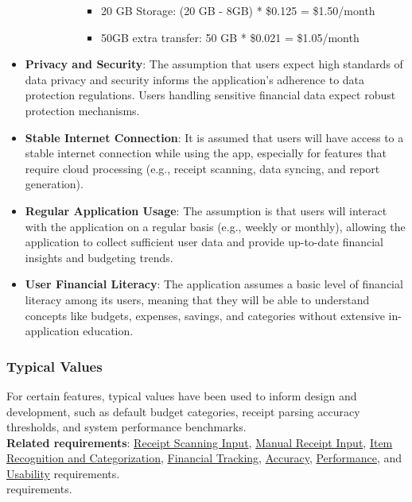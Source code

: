\documentclass[12pt]{article}
\begin{document}
\begin{itemize}
\begin{itemize}
\begin{enumerate}
\begin{itemize}
\begin{itemize}
						\item 20 GB Storage: (20 GB - 8GB) * \$0.125 = \$1.50/month
						\item 50GB extra transfer: 50 GB * \$0.021 = \$1.05/month
					\end{itemize}
				\end{itemize}
			\end{enumerate}
		\end{itemize}
    \item \textbf{Privacy and Security}: The assumption that users expect high
    standards of data privacy and security informs the application's adherence to
    data protection regulations. Users handling sensitive financial data expect
    robust protection mechanisms.
    \item \textbf{Stable Internet Connection}: It is assumed that users will
    have access to a stable internet connection while using the app, especially
    for features that require cloud processing (e.g., receipt scanning, data
    syncing, and report generation).
    \item \textbf{Regular Application Usage}: The assumption is that users will
    interact with the application on a regular basis (e.g., weekly or monthly),
    allowing the application to collect sufficient user data and provide
    up-to-date financial insights and budgeting trends.
    \item \textbf{User Financial Literacy}: The application assumes a basic
    level of financial literacy among its users, meaning that they will be able
    to understand concepts like budgets, expenses, savings, and categories
    without extensive in-application education.
\end{itemize}

\subsubsection{Typical Values}
For certain features, typical values have been used to inform design and
development, such as default budget categories, receipt parsing accuracy
thresholds, and system performance benchmarks.\\

\noindent\textbf{Related requirements}: \hyperref[FR-IP]{Receipt Scanning
Input}, \hyperref[FR-MIS]{Manual Receipt Input}, \hyperref[FR-RS]{Item
Recognition and Categorization}, \hyperref[FR-FT]{Financial Tracking},
\hyperref[NFR-ACC]{Accuracy}, \hyperref[NFR-PERF]{Performance}, and
\hyperref[NFR-USAB]{Usability} requirements.\\
requirements.\\
\end{document}
